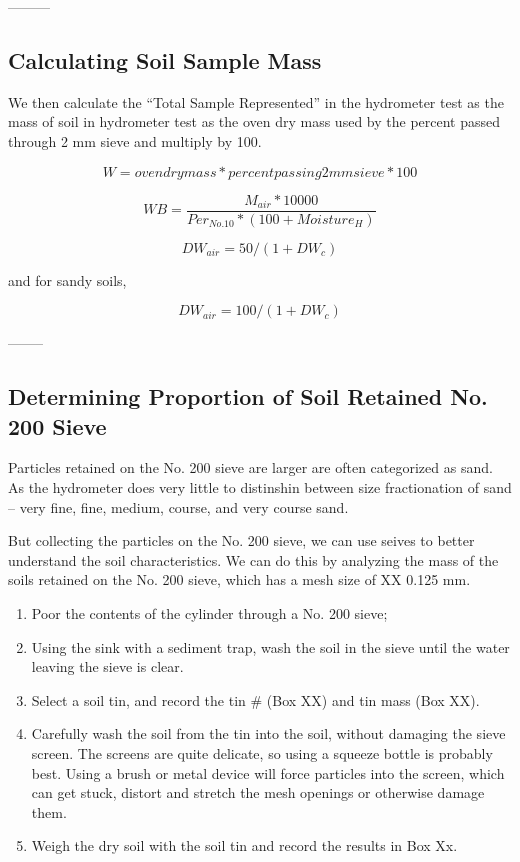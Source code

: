 \documentclass[12pt]{../SOP4_alpha}\usepackage[]{graphicx}\usepackage[]{xcolor}
\begin{document}
  
  ---------
  

\subsection{Calculating Soil Sample Mass}

\NP We then calculate the ``Total Sample Represented'' in the hydrometer test as the mass of soil in hydrometer test as the oven dry mass used by the percent passed through 2 mm sieve and multiply by 100.


\begin{equation}
W = oven dry mass * percent passing 2mm sieve * 100
\end{equation}

\begin{equation}
WB = \frac{M_{air}*10000}{Per_{No.10} * (100 + Moisture_H)}
\end{equation}



\begin{equation}
DW_{air} = 50/(1+DW_c)
\end{equation}

\noindent and for sandy soils,

\begin{equation}
DW_{air} = 100/(1+DW_c)
\end{equation}



--------


\subsection*{Determining Proportion of Soil Retained No. 200 Sieve}

\NP Particles retained on the No. 200 sieve are larger are often categorized as sand. As the hydrometer does very little to distinshin between size fractionation of sand -- very fine, fine, medium, course, and very course sand. 

\NP But collecting the particles on the No. 200 sieve, we can use seives to better understand the soil characteristics. We can do this by analyzing the mass of the soils retained on the No. 200 sieve, which has a mesh size of XX 0.125 mm.  

\begin{enumerate}
	\item Poor the contents of the cylinder through a No. 200 sieve;
	\item Using the sink with a sediment trap, wash the soil in the sieve until the water leaving the sieve is clear. 
	\item Select a soil tin, and record the tin \# (Box XX) and tin mass (Box XX). 
	\item Carefully wash the soil from the tin into the soil, without damaging the sieve screen. The screens are quite delicate, so using a squeeze bottle is probably best. Using a brush or metal device will force particles into the screen, which can get stuck, distort and stretch the mesh openings or otherwise damage them. 
	\item Weigh the dry soil with the soil tin and record the results in Box Xx.
\end{enumerate}
\end{document}
